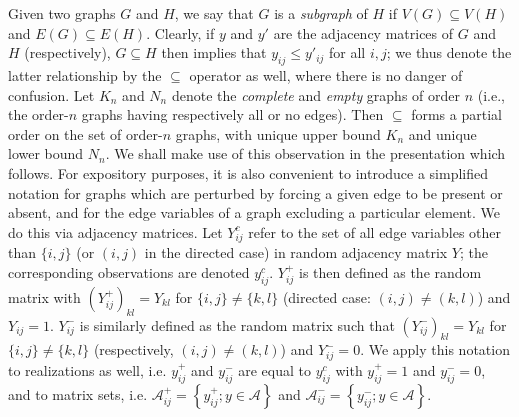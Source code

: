 \documentclass[11pt]{article}
\begin{document}
Given two graphs $G$ and $H$, we say that $G$ is a \emph{subgraph} of $H$ if $V(G) \subseteq V(H)$ and $E(G) \subseteq E(H)$.  Clearly, if $y$ and $y'$ are the adjacency matrices of $G$ and $H$ (respectively), $G \subseteq H$ then implies that $y_{ij} \le y'_{ij}$ for all $i,j$; we thus denote the latter relationship by the $\subseteq$ operator as well, where there is no danger of confusion.  Let $K_n$ and $N_n$ denote the \emph{complete} and \emph{empty} graphs of order $n$ (i.e., the order-$n$ graphs having respectively all or no edges).  Then $\subseteq$ forms a partial order on the set of order-$n$ graphs, with unique upper bound $K_n$ and unique lower bound $N_n$.  We shall make use of this observation in the presentation which follows.  For expository purposes, it is also convenient to introduce a simplified notation for graphs which are perturbed by forcing a given edge to be present or absent, and for the edge variables of a graph excluding a particular element.  We do this via adjacency matrices.  Let $Y^c_{ij}$ refer to the set of all edge variables other than $\{i,j\}$ (or $(i,j)$ in the directed case) in random adjacency matrix $Y$; the corresponding observations are denoted $y^c_{ij}$.  $Y^+_{ij}$ is then defined as the random matrix with $\left(Y^+_{ij}\right)_{kl}=Y_{kl}$ for $\{i,j\} \neq \{k,l\}$ (directed case: $(i,j) \neq (k,l)$) and $Y_{ij}=1$.  $Y^-_{ij}$ is similarly defined as the random matrix such that $\left(Y^-_{ij}\right)_{kl}=Y_{kl}$ for $\{i,j\} \neq \{k,l\}$ (respectively, $(i,j) \neq (k,l)$) and $Y^-_{ij}=0$.  We apply this notation to realizations as well, i.e. $y^+_{ij}$ and $y^-_{ij}$ are equal to $y^c_{ij}$ with $y^+_{ij}=1$ and $y^-_{ij}=0$, and to matrix sets, i.e. $\mathcal{A}^+_{ij}=\left\{y^+_{ij}; y \in \mathcal{A}\right\}$ and $\mathcal{A}^-_{ij}=\left\{y^-_{ij}; y \in \mathcal{A}\right\}$.
\end{document}
